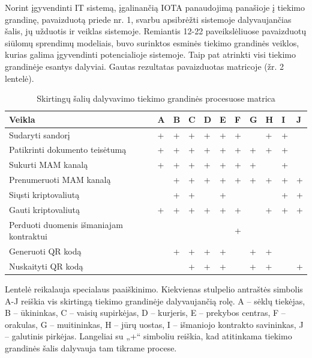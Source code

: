 Norint įgyvendinti IT sistemą, įgalinančią IOTA panaudojimą panašioje į tiekimo grandinę, pavaizduotą priede nr. 1, svarbu apsibrėžti sistemoje dalyvaujančias šalis, jų užduotis ir veiklas sistemoje. Remiantis 12-22 paveikslėliuose pavaizduotų siūlomų sprendimų modeliais, buvo surinktos esminės tiekimo grandinės veiklos, kurias galima įgyvendinti potencialioje sistemoje. Taip pat atrinkti visi tiekimo grandinėje esantys dalyviai. Gautas rezultatas pavaizduotas matricoje (žr. 2 lentelė). 

\begin{table}[h]
\centering
\caption{Skirtingų šalių dalyvavimo tiekimo grandinės procesuose matrica}
\begin{tabular}{|l|l|l|l|l|l|l|l|l|l|l|}
\hline
\textbf{Veikla} & \multicolumn{1}{c|}{\textbf{A}} & \multicolumn{1}{c|}{\textbf{B}} & \textbf{C} & \textbf{D} & \textbf{E} & \textbf{F} & \textbf{G} & \textbf{H} & \textbf{I} & \textbf{J} \\ \hline
Sudaryti sandorį & + & + & + & + & + & + &  & + & + &  \\ \hline
Patikrinti dokumento teisėtumą & + & + & + & + & + & + & + & + & + &  \\ \hline
Sukurti MAM kanalą & + & + & + & + & + & + & + &  & + &  \\ \hline
Prenumeruoti MAM kanalą &  & + & + & + & + & + & + & + & + & + \\ \hline
Siųsti kriptovaliutą &  & + & + &  & + &  &  &  & + & + \\ \hline
Gauti kriptovaliutą & + & + & + & + & + & + &  & + & + & + \\ \hline
Perduoti duomenis išmaniajam kontraktui &  &  &  &  &  & + &  &  &  &  \\ \hline
Generuoti QR kodą &  & + & + & + & + &  & + & + &  &  \\ \hline
Nuskaityti QR kodą &  &  & + & + & + &  & + & + &  & + \\ \hline
\end{tabular}
\end{table}

Lentelė reikalauja specialaus paaiškinimo. Kiekvienas stulpelio antraštės simbolis A-J reiškia vis skirtingą tiekimo grandinėje dalyvaujančią rolę. A – sėklų tiekėjas, B – ūkininkas, C – vaisių supirkėjas, D – kurjeris, E – prekybos centras, F – orakulas, G – muitininkas, H – jūrų uostas, I – išmaniojo kontrakto savininkas, J – galutinis pirkėjas. Langeliai su „+“ simboliu reiškia, kad atitinkama tiekimo grandinės šalis dalyvauja tam tikrame procese.

